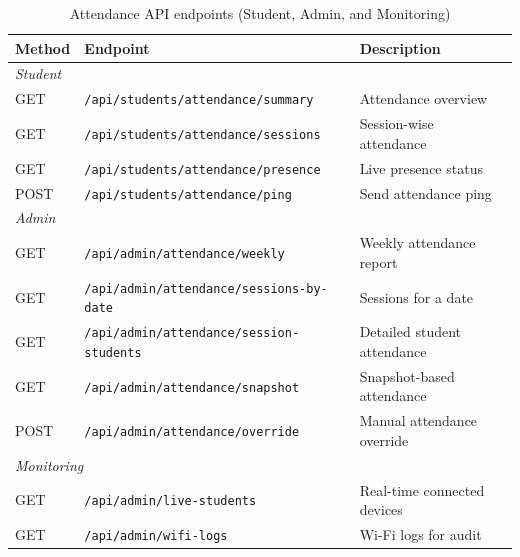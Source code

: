 \begin{table}[!ht]
\centering
\begin{tabular}{|l|l|p{6.5cm}|}
\hline
\textbf{Method} & \textbf{Endpoint} & \textbf{Description} \\ \hline
\multicolumn{3}{|l|}{\textit{Student}} \\ \hline
GET  & \texttt{/api/students/attendance/summary}  & Attendance overview \\
GET  & \texttt{/api/students/attendance/sessions} & Session-wise attendance \\
GET  & \texttt{/api/students/attendance/presence} & Live presence status \\
POST & \texttt{/api/students/attendance/ping}     & Send attendance ping \\ \hline
\multicolumn{3}{|l|}{\textit{Admin}} \\ \hline
GET  & \texttt{/api/admin/attendance/weekly}           & Weekly attendance report \\
GET  & \texttt{/api/admin/attendance/sessions-by-date} & Sessions for a date \\
GET  & \texttt{/api/admin/attendance/session-students} & Detailed student attendance \\
GET  & \texttt{/api/admin/attendance/snapshot}         & Snapshot-based attendance \\
POST & \texttt{/api/admin/attendance/override}         & Manual attendance override \\ \hline
\multicolumn{3}{|l|}{\textit{Monitoring}} \\ \hline
GET & \texttt{/api/admin/live-students} & Real-time connected devices \\
GET & \texttt{/api/admin/wifi-logs}     & Wi-Fi logs for audit \\ \hline
\end{tabular}
\caption{Attendance API endpoints (Student, Admin, and Monitoring)}
\label{tab:api_attendance}
\end{table}
